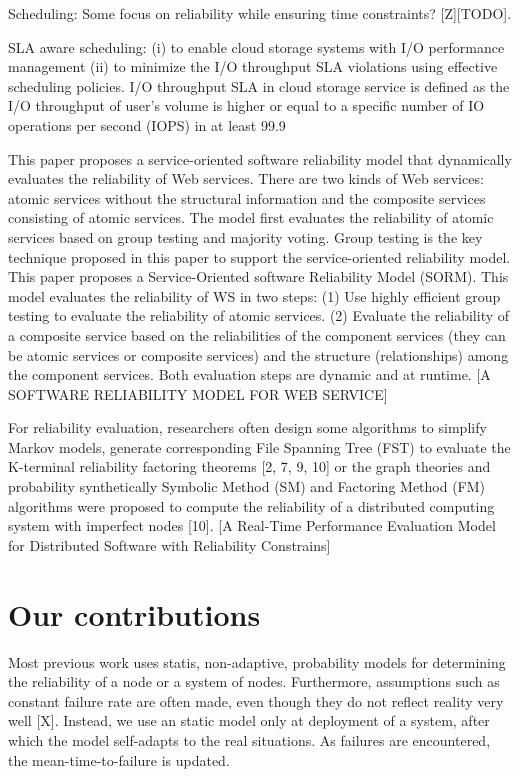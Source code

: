 \documentclass{cslthse-msc}
\begin{document}
Scheduling:
Some focus on reliability while ensuring time constraints? [Z][TODO].

SLA aware scheduling: 
 (i) to enable cloud storage systems with I/O performance management (ii) to minimize the I/O throughput SLA violations using effective scheduling policies. I/O throughput SLA in cloud storage service is defined as the I/O throughput of user’s volume is higher or equal to a specific number of IO operations per second (IOPS) in at least 99.9%


This paper proposes a service-oriented software reliability model that dynamically evaluates the reliability of Web services. There are two kinds of Web services: atomic services without the structural information and the composite services consisting of atomic services. The model first evaluates the reliability of atomic services based on group testing and majority voting. Group testing is the key technique proposed in this paper to support the service-oriented reliability model.
This paper proposes a Service-Oriented software Reliability Model (SORM). This model evaluates the reliability of WS in two steps: (1) Use highly efficient group testing to evaluate the reliability of atomic services.
(2) Evaluate the reliability of a composite service based on the reliabilities of the component services (they can be atomic services or composite services) and the structure (relationships) among the component services. Both evaluation steps are dynamic and at runtime. [A SOFTWARE RELIABILITY MODEL FOR WEB SERVICE]


For reliability evaluation, researchers often design some algorithms to simplify Markov models, generate corresponding File Spanning Tree (FST) to evaluate the K-terminal reliability factoring theorems [2, 7, 9, 10] or the graph theories and probability synthetically 
Symbolic Method (SM) and Factoring Method (FM) algorithms were proposed to compute the reliability of a distributed computing system with imperfect nodes [10].
[A Real-Time Performance Evaluation Model for Distributed Software with Reliability Constrains]
\cite{taskSchedulingReplication}


\section{Our contributions}

Most previous work uses statis, non-adaptive, probability models for determining the reliability of a node or a system of nodes. Furthermore, assumptions such as constant failure rate are often made, even though they do not reflect reality very well [X]. Instead, we use an static model only at deployment of a system, after which the model self-adapts to the real situations. As failures are encountered, the mean-time-to-failure is updated.
\end{document}
